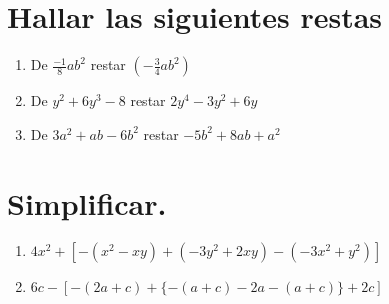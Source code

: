 \documentclass{article}
\begin{document}
\section*{Hallar las siguientes restas}

\begin{enumerate}
    \item De $\frac{-1}{8} ab^2$ restar $(-\frac{3}{4}ab^2)$
    \item De $y^2 + 6y^3 - 8$ restar $2y^4 - 3y^2 + 6y$
    \item De $3a^2 + ab - 6b^2$ restar $-5b^2 + 8ab + a^2$
\end{enumerate}

\section*{Simplificar.}

\begin{enumerate}
    \item $4x^2 + [-(x^2 - xy)+(-3y^2 + 2xy) - (-3x^2 + y^2)]$
    \item $6c - [-(2a + c) + \{-(a + c) - 2a - (a + c)\} + 2c]$
\end{enumerate}
\end{document}

